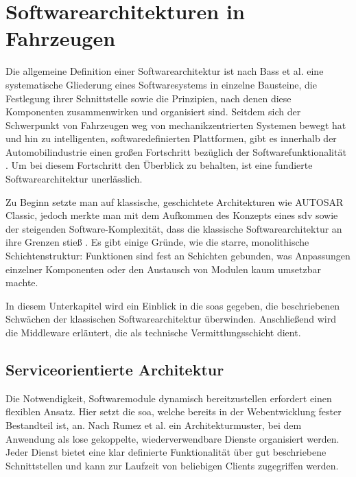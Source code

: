 \section{Softwarearchitekturen in Fahrzeugen}
\label{sect:sa}
Die allgemeine Definition einer Softwarearchitektur ist nach Bass et al. \cite{bass2021} eine systematische Gliederung eines Softwaresystems in einzelne Bausteine, die Festlegung ihrer Schnittstelle sowie die Prinzipien, nach denen diese Komponenten zusammenwirken und organisiert sind. Seitdem sich der Schwerpunkt von Fahrzeugen weg von mechanikzentrierten Systemen bewegt hat und hin zu intelligenten, softwaredefinierten Plattformen, gibt es innerhalb der Automobilindustrie einen großen Fortschritt bezüglich der Softwarefunktionalität \cite{rumezOverviewAutomotiveServiceOriented2020}\cite{broy2006}. Um bei diesem Fortschritt den Überblick zu behalten, ist eine fundierte Softwarearchitektur unerlässlich.

Zu Beginn setzte man auf klassische, geschichtete Architekturen wie AUTOSAR Classic, jedoch merkte man mit dem Aufkommen des Konzepts eines \gls{sdv} sowie der steigenden Software-Komplexität, dass die klassische Softwarearchitektur an ihre Grenzen stieß  \cite{rumezOverviewAutomotiveServiceOriented2020}. Es gibt einige Gründe, wie die starre, monolithische Schichtenstruktur: Funktionen sind fest an Schichten gebunden, was Anpassungen einzelner Komponenten oder den Austausch von Modulen kaum umsetzbar machte.

In diesem Unterkapitel wird ein Einblick in die \glspl{soa} gegeben, die beschriebenen Schwächen der klassischen Softwarearchitektur überwinden. Anschließend wird die Middleware erläutert, die als technische Vermittlungsschicht dient.

\subsection{Serviceorientierte Architektur}
\label{subsect:soa}
Die Notwendigkeit, Softwaremodule dynamisch bereitzustellen erfordert einen flexiblen Ansatz. Hier setzt die \gls{soa}, welche bereits in der Webentwicklung fester Bestandteil ist, an. Nach Rumez et al.\cite{rumezOverviewAutomotiveServiceOriented2020} ein Architekturmuster, bei dem Anwendung als lose gekoppelte, wiederverwendbare Dienste organisiert werden. Jeder Dienst bietet eine klar definierte Funktionalität über gut beschriebene Schnittstellen und kann zur Laufzeit von beliebigen Clients zugegriffen werden.

